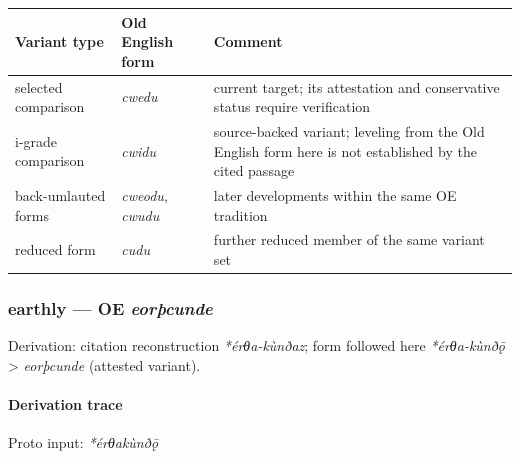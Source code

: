 \documentclass[
  british,
  a4paper,
]{article}
\newcounter{none} %
\begin{document}
{\def\LTcaptype{none} %
\begin{longtable}[]{@{}
  >{\raggedright\arraybackslash}p{}
  >{\raggedright\arraybackslash}p{}
  >{\raggedright\arraybackslash}p{}@{}}
\toprule\noalign{}
\begin{minipage}[b]{\linewidth}\raggedright
Variant type
\end{minipage} & \begin{minipage}[b]{\linewidth}\raggedright
Old English form
\end{minipage} & \begin{minipage}[b]{\linewidth}\raggedright
Comment
\end{minipage} \\
\midrule\noalign{}
\endhead
\bottomrule\noalign{}
\endlastfoot
selected comparison & {\emph{cwedu}} & current target; its attestation
and conservative status require verification \\
i-grade comparison & {\emph{cwidu}} & source-backed variant; leveling
from the Old English form here is not established by the cited
passage \\
back-umlauted forms & {\emph{cweodu}}, {\emph{cwudu}} & later
developments within the same OE tradition \\
reduced form & {\emph{cudu}} & further reduced member of the same
variant set \\
\end{longtable}
}

\subsubsection{\texorpdfstring{earthly --- OE
\emph{eorþcunde}}{earthly --- OE eorþcunde}}\label{earthly-oe-eoruxfecunde}

Derivation: citation reconstruction \emph{*érθa-kùnðaz}; form followed
here \emph{*érθa-kùnðǭ} \textgreater{} \emph{eorþcunde} (attested
variant).

\paragraph{Derivation trace}\label{derivation-trace-106}

Proto input: \emph{*érθakùnðǭ}

\begingroup
\setlength{\fboxsep}{6pt}
\end{document}
